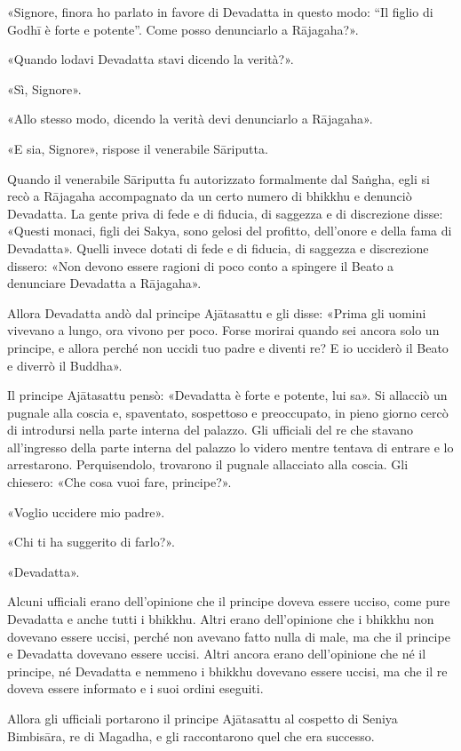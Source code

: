 «Signore, finora ho parlato in favore di Devadatta in questo modo: “Il
figlio di Godhī è forte e potente”. Come posso denunciarlo a Rājagaha?».


«Quando lodavi Devadatta stavi dicendo la verità?».


«Sì, Signore».


«Allo stesso modo, dicendo la verità devi denunciarlo a Rājagaha».


«E sia, Signore», rispose il venerabile Sāriputta.


Quando il venerabile Sāriputta fu autorizzato formalmente dal Saṅgha,
egli si recò a Rājagaha accompagnato da un certo numero di bhikkhu e
denunciò Devadatta. La gente priva di fede e di fiducia, di saggezza e
di discrezione disse: «Questi monaci, figli dei Sakya, sono gelosi del
profitto, dell’onore e della fama di Devadatta». Quelli invece dotati di
fede e di fiducia, di saggezza e discrezione dissero: «Non devono essere
ragioni di poco conto a spingere il Beato a denunciare Devadatta a
Rājagaha».


Allora Devadatta andò dal principe Ajātasattu e gli disse: «Prima gli
uomini vivevano a lungo, ora vivono per poco. Forse morirai quando sei
ancora solo un principe, e allora perché non uccidi tuo padre e diventi
re? E io ucciderò il Beato e diverrò il Buddha».


Il principe Ajātasattu pensò: «Devadatta è forte e potente, lui sa». Si
allacciò un pugnale alla coscia e, spaventato, sospettoso e preoccupato,
in pieno giorno cercò di introdursi nella parte interna del palazzo. Gli
ufficiali del re che stavano all’ingresso della parte interna del
palazzo lo videro mentre tentava di entrare e lo arrestarono.
Perquisendolo, trovarono il pugnale allacciato alla coscia. Gli
chiesero: «Che cosa vuoi fare, principe?».


«Voglio uccidere mio padre».


«Chi ti ha suggerito di farlo?».


«Devadatta».


Alcuni ufficiali erano dell’opinione che il principe doveva essere
ucciso, come pure Devadatta e anche tutti i bhikkhu. Altri erano
dell’opinione che i bhikkhu non dovevano essere uccisi, perché non
avevano fatto nulla di male, ma che il principe e Devadatta dovevano
essere uccisi. Altri ancora erano dell’opinione che né il principe, né
Devadatta e nemmeno i bhikkhu dovevano essere uccisi, ma che il re
doveva essere informato e i suoi ordini eseguiti.


Allora gli ufficiali portarono il principe Ajātasattu al cospetto di
Seniya Bimbisāra, re di Magadha, e gli raccontarono quel che era
successo.


